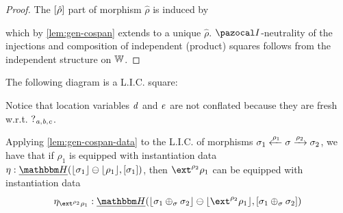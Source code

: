 \begin{proof}
    The $[\hat\rho]$ part of morphism $\hat\rho$ is induced by
    \begin{center}
    \end{center}
    which by \cref{lem:gen-cospan} extends to a unique $\hat\rho$.
    $\mcatI$-neutrality of the injections and composition of independent (product) squares follows from the independent structure on $\mathbb{W}$.
\end{proof}

\begin{example}\label{ex:tempC-lic}
The following diagram is a L.I.C. square: 
\begin{center}
\end{center}
Notice that location variables $\mathit{d}$ and $\mathit{e}$ are not conflated because they are fresh w.r.t. $?_{\mathit{a},\mathit{b},\mathit{c}}$.
\end{example}

\begin{remark}\label{rem:lic-T-data}
Applying \cref{lem:gen-cospan-data} to the L.I.C. of morphisms $\sigma_1 \xleftarrow{\rho_1} \sigma \xrightarrow{\rho_2} \sigma_2$,
we have that if $\rho_1$ is equipped with instantiation data $\mvarM : \dheapF(\concL{\sigma_1} \ominus \concL{\rho_1},\anyL{\sigma_1})$,
then $\ext^{\rho_2}\rho_1$ can be equipped with instantiation data 
\[ \mvarM_{\ext^{\rho_2}\rho_1} : \dheapF(\concL{\sigma_1 \liplus\sigma \sigma_2} \ominus \concL{\ext^{\rho_2}\rho_1}, \anyL{\sigma_1 \liplus\sigma \sigma_2}) \] 
\end{remark}


